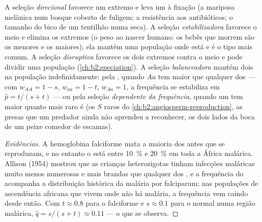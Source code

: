 \begin{proposition}\label{prop:b2:population-genetics:kinds}
A seleção \emph{direcional} favorece um extremo e leva um  à
fixação (a mariposa melânica num bosque coberto de fuligem; a
resistência aos antibióticos; o tamanho do bico de um tentilhão numa
seca). A seleção \emph{estabilizadora} favorece o meio e elimina os
extremos (o peso ao nascer humano: os bebês que morrem são os menores e
os maiores); ela mantém uma população onde está e é o tipo mais comum.
A seleção \emph{disruptiva} favorece os dois extremos contra o meio e
pode dividir uma população (\cref{ch:b2:speciation}). A seleção
\emph{balanceadora} mantém dois  na população indefinidamente:
pela \emph{}, quando $Aa$ tem  maior que
qualquer dos  --- com
$w_{AA} = 1 - s$, $w_{aa} = 1 - t$, $w_{Aa} = 1$, a frequência
se estabiliza em $\hat p = t/(s + t)$ --- ou pela seleção \emph{dependente
da frequência}, quando um  tem  maior quanto mais raro é
(os  $S$ raros do \cref{ch:b2:angiosperm-reproduction}, as presas
que um predador ainda não aprendeu a reconhecer, os dois lados da boca
de um peixe comedor de escamas).
\end{proposition}
\begin{proof}[Evidências]
A hemoglobina falciforme mata a maioria dos  antes que se
reproduzam, e no entanto o  está entre \qty{10}{\%} e \qty{20}{\%}
em toda a África malárica. Allison (1954) mostrou que as crianças
heterozigotas tinham infecções maláricas muito menos numerosas e mais
brandas que qualquer dos , e a frequência do  acompanha
a distribuição histórica da malária por falciparum; nas populações de
ascendência africana que vivem onde não há malária, a frequência vem
caindo desde então. Com $t \approx 0.8$ para o  falciforme
e $s \approx 0.1$ para o  normal numa região malárica,
$\hat q = s/(s + t) \approx 0.11$ --- o que se observa.
\end{proof}

